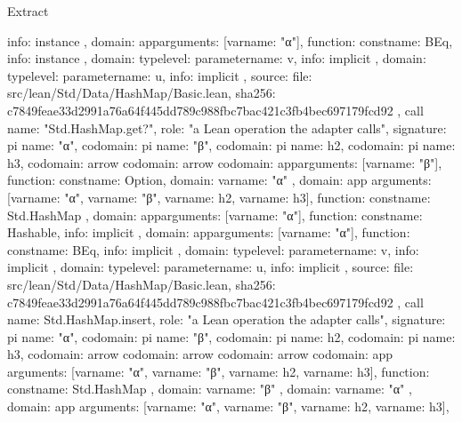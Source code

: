 \begin{lexlean}{Extract}
\begin{toolingmodule}
{{{{{{              info: instance
            },
            domain: app{arguments: [var{name: "α"}], function: const{name: BEq}},
            info: instance
          },
          domain: type{level: parameter{name: v}},
          info: implicit
        },
        domain: type{level: parameter{name: u}},
        info: implicit
      },
      source: {
        file: src/lean/Std/Data/HashMap/Basic.lean,
        sha256: c7849feae33d2991a76a64f445dd789c988fbc7bac421c3fb4bec697179fcd92
      }
    },
    call{
      name: "Std.HashMap.get?",
      role: "a Lean operation the adapter calls",
      signature: pi{
        name: "α",
        codomain: pi{
          name: "β",
          codomain: pi{
            name: h2,
            codomain: pi{
              name: h3,
              codomain: arrow{
                codomain: arrow{
                  codomain: app{arguments: [var{name: "β"}], function: const{name: Option}},
                  domain: var{name: "α"}
                },
                domain: app{
                  arguments: [var{name: "α"}, var{name: "β"}, var{name: h2}, var{name: h3}],
                  function: const{name: Std.HashMap}
                }
              },
              domain: app{arguments: [var{name: "α"}], function: const{name: Hashable}},
              info: implicit
            },
            domain: app{arguments: [var{name: "α"}], function: const{name: BEq}},
            info: implicit
          },
          domain: type{level: parameter{name: v}},
          info: implicit
        },
        domain: type{level: parameter{name: u}},
        info: implicit
      },
      source: {
        file: src/lean/Std/Data/HashMap/Basic.lean,
        sha256: c7849feae33d2991a76a64f445dd789c988fbc7bac421c3fb4bec697179fcd92
      }
    },
    call{
      name: Std.HashMap.insert,
      role: "a Lean operation the adapter calls",
      signature: pi{
        name: "α",
        codomain: pi{
          name: "β",
          codomain: pi{
            name: h2,
            codomain: pi{
              name: h3,
              codomain: arrow{
                codomain: arrow{
                  codomain: arrow{
                    codomain: app{
                      arguments: [var{name: "α"}, var{name: "β"}, var{name: h2}, var{name: h3}],
                      function: const{name: Std.HashMap}
                    },
                    domain: var{name: "β"}
                  },
                  domain: var{name: "α"}
                },
                domain: app{
                  arguments: [var{name: "α"}, var{name: "β"}, var{name: h2}, var{name: h3}],
}}}}}}}}
\end{toolingmodule}
\end{lexlean}
